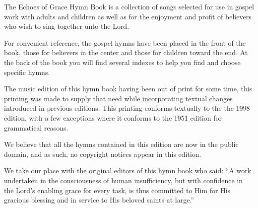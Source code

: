 \documentclass{book}
\begin{document}
The {\textit{}Echoes of Grace Hymn Book} is a collection of songs selected for
use in gospel work with adults and children as well as for the enjoyment and
profit of believers who wish to sing together unto the Lord.

For convenient reference, the gospel hymns have been placed in the front of the
book, those for believers in the center and those for children toward the end.
At the back of the book you will find several indexes to help you find and
choose specific hymns.

The music edition of this hymn book having been out of print for some time,
this printing was made to supply that need while incorporating textual changes
introduced in previous editions. This printing conforms textually to the the
1998 edition, with a few exceptions where it conforms to the 1951 edition for
grammatical reasons.

We believe that all the hymns contained in this edition are now in the public
domain, and as such, no copyright notices appear in this edition.

We take our place with the original editors of this hymn book who said: ``A
work undertaken in the consciousness of human insufficiency, but with
confidence in the Lord's enabling grace for every task, is thus committed to
Him for His gracious blessing and in service to His beloved saints at large.''

\vspace*{\fill}

\afterpage{\null\newpage}

\restoregeometry



\restoregeometry

\end{document}
